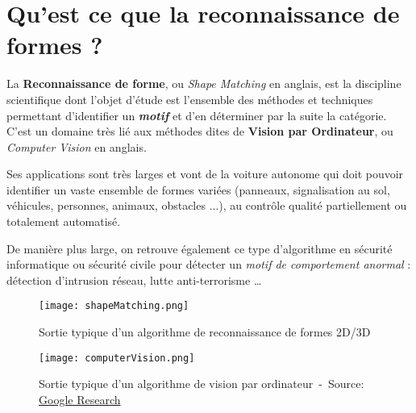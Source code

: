 \section{Qu'est ce que la reconnaissance de formes ?}

La \textbf{Reconnaissance de forme}, ou \textit{Shape Matching} en anglais, est la discipline scientifique dont l'objet d'étude est l'ensemble des méthodes et techniques permettant d'identifier un \textbf{\textit{motif}} et d'en déterminer par la suite la catégorie. C'est un domaine très lié aux méthodes dites de \textbf{Vision par Ordinateur}, ou \textit{Computer Vision} en anglais.

Ses applications sont très larges et vont de la voiture autonome qui doit pouvoir identifier un vaste ensemble de formes variées (panneaux, signalisation au sol, véhicules, personnes, animaux, obstacles ...), au contrôle qualité partiellement ou totalement automatisé.

De manière plus large, on retrouve également ce type d'algorithme en sécurité informatique ou sécurité civile pour détecter un \textit{motif de comportement anormal} : détection d'intrusion réseau, lutte anti-terrorisme \ldots

 \begin{figure}[H]
    \centering
    \texttt{[image: shapeMatching.png]}
	\caption{Sortie typique d'un algorithme de reconnaissance de formes 2D/3D~\cite{shapeMatchingImg}}\label{image.shapeMatching} 
\end{figure}

 \begin{figure}[H]
    \centering
    \texttt{[image: computerVision.png]}
	\caption{Sortie typique d'un algorithme de vision par ordinateur~-~Source: \href{http://googleresearch.blogspot.fr/2014/09/building-deeper-understanding-of-images.html}{Google Research}}\label{image.computerVision} 
\end{figure}